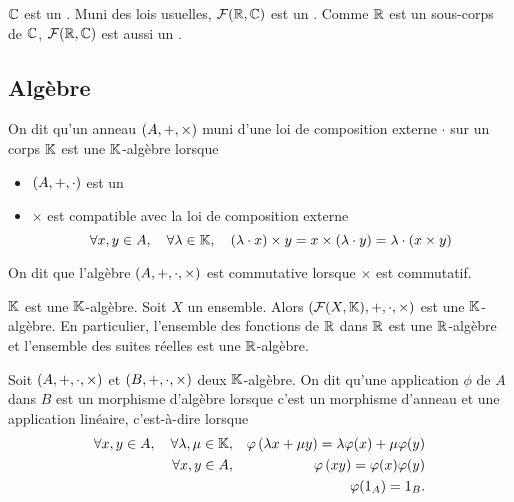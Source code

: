 \documentclass{magnolia}
\begin{document}
\begin{remarques}
\remarque[utile=-2] $\mathbb{C}$ est un \Rev.
\remarque[utile=-1] Muni des lois usuelles, $\mathcal{F}(\mathbb{R},\mathbb{C})$ est un \Cev.
  Comme $\mathbb{R}$ est un sous-corps de $\mathbb{C}$, $\mathcal{F}(\mathbb{R},\mathbb{C})$ est aussi un \Rev.
\end{remarques}


\subsection{Algèbre}

\begin{definition}
On dit qu'un anneau $\left(A,+,\times\right)$ muni d'une loi de composition externe
$\cdot$ sur un corps $\mathbb{K}$ est une $\mathbb{K}$-algèbre lorsque
\begin{itemize}
\item $\left(A,+,\cdot\right)$ est un \Kev
\item $\times$ est compatible avec la loi de composition externe
  \[\forall x,y\in A ,\quad \forall \lambda\in\mathbb{K} ,\quad
    \left(\lambda\cdot x\right)\times y=x\times\left(\lambda\cdot y\right)=
     \lambda\cdot\left(x\times y\right)\]
\end{itemize}
On dit que l'algèbre $\left(A,+,\cdot,\times\right)$ est commutative lorsque $\times$
est commutatif.
\end{definition}

\begin{exemples}
\exemple $\mathbb{K}$ est une $\mathbb{K}$-algèbre.
\exemple Soit $X$ un ensemble. Alors $(\mathcal{F}(X,\mathbb{K}),+,\cdot,\times)$ est une $\mathbb{K}$-algèbre. En particulier, l'ensemble des fonctions de $\mathbb{R}$ dans $\mathbb{R}$ est une $\mathbb{R}$-algèbre et l'ensemble des suites réelles est une $\mathbb{R}$-algèbre.
\end{exemples}

\begin{definition}
Soit $\left(A,+,\cdot,\times\right)$ et $\left(B,+,\cdot,\times\right)$ deux $\mathbb{K}$-algèbre. On dit qu'une application $\phi$ de $A$ dans $B$ est un morphisme d'algèbre lorsque c'est un morphisme
d'anneau et une application linéaire, c'est-à-dire lorsque
\begin{eqnarray*}
  \forall x,y\in A ,\quad \forall \lambda,\mu\in\mathbb{K}, & &
    \varphi\left(\lambda x+\mu y\right)=\lambda \varphi(x)+\mu \varphi(y)\\
  \forall x,y\in A, & &
    \varphi\left(xy\right)=\varphi(x)\varphi(y)\\
  & & \varphi(1_A)=1_B.
  \end{eqnarray*}
\end{definition}
\end{document}
